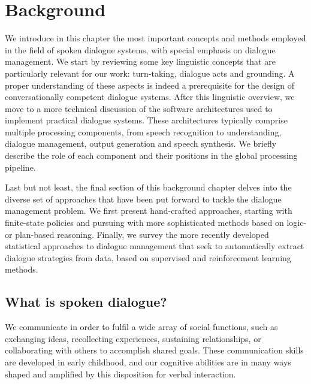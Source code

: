 
\chapter{Background}
\label{chap:background}

We introduce in this chapter the most important concepts and methods employed in the field of spoken dialogue systems, with special emphasis on dialogue management.  We start by reviewing some key linguistic concepts that are particularly relevant for our work: turn-taking, dialogue acts and grounding.  A proper understanding of these aspects is indeed a prerequisite for the design of conversationally competent dialogue systems. After this linguistic overview, we move to a more technical discussion of the software architectures used to implement practical dialogue systems.  These architectures typically comprise multiple processing components, from speech recognition to understanding, dialogue management, output generation and speech synthesis.  We briefly describe the role of each component and their positions in the global processing pipeline. 

Last but not least, the final section of this background chapter delves into the diverse set of approaches that have been put forward to tackle the dialogue management problem.  We first present hand-crafted approaches, starting with finite-state policies and pursuing with more sophisticated methods based on logic- or plan-based reasoning.  Finally, we survey the more recently developed statistical approaches to dialogue management that seek to automatically extract dialogue strategies from data, based on supervised and reinforcement learning methods.

\section{What is spoken dialogue?}

We communicate in order to fulfil a wide array of social functions, such as exchanging ideas, recollecting experiences,  sustaining relationships, or collaborating with others to accomplish shared goals. These communication skills are developed in early childhood, and our cognitive abilities are in many ways shaped and amplified by this disposition for verbal interaction.  

